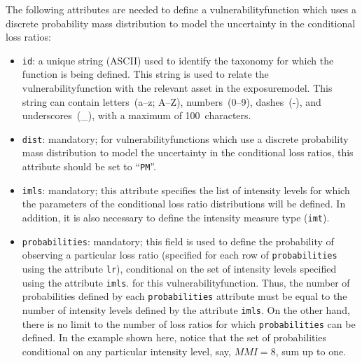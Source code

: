 \inputminted[firstline=24,firstnumber=24,lastline=33,fontsize=\footnotesize,frame=single,linenos,bgcolor=lightgray]{xml}{oqum/risk/Verbatim/input_vulnerability.xml}

The following attributes are needed to define a \gls{vulnerabilityfunction}
which uses a discrete probability mass distribution to model the uncertainty
in the conditional loss ratios:

\begin{itemize}

  \item \Verb+id+: a unique string (ASCII) used to identify the \gls{taxonomy} for 
    which the function is being defined. This string is used to relate the 
    \gls{vulnerabilityfunction} with the relevant \gls{asset} in the 
    \gls{exposuremodel}. This string can contain letters~(a--z; A--Z), 
    numbers~(0--9), dashes~(-), and underscores~(\_), with a maximum of
    100~characters.

  \item \Verb+dist+: mandatory; for \glspl{vulnerabilityfunction} which use a 
    discrete probability mass distribution to model the uncertainty in the
    conditional loss ratios, this attribute should be set to ``\Verb+PM+''.

  \item \Verb+imls+: mandatory; this attribute specifies the list of intensity levels
    for which the parameters of the conditional loss ratio distributions will
    be defined. In addition, it is also necessary to define the intensity 
    measure type (\Verb+imt+).

  \item \Verb+probabilities+: mandatory; this field is used to define the
    probability of observing a particular loss ratio (specified for each row of
    \Verb+probabilities+ using the attribute \Verb+lr+), conditional on the set
    of intensity levels specified using the attribute \Verb+imls+.
    for this \gls{vulnerabilityfunction}. Thus, the number of probabilities
    defined by each \Verb+probabilities+ attribute must be equal to the number
    of intensity levels defined by the attribute \Verb+imls+. On the other hand,
    there is no limit to the number of loss ratios for which
    \Verb+probabilities+ can be defined. In the example shown here, notice that
    the set of probabilities conditional on any particular intensity level,
    say, $MMI = 8$, sum up to one.

\end{itemize}


